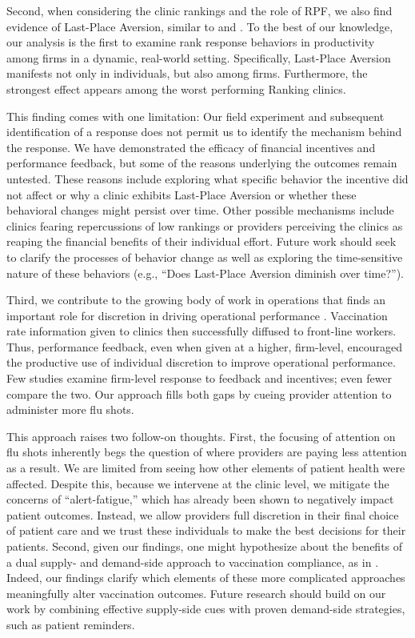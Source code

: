 \begin{onehalfspace}
 Second, when considering the clinic rankings and the role of RPF, we also find evidence of Last-Place Aversion, similar to \cite{Kuziemko2014,Gill2019} and \cite{Buell2021}. To the best of our knowledge, our analysis is the first to examine rank response behaviors in productivity among firms in a dynamic, real-world setting. Specifically, Last-Place Aversion manifests not only in individuals, but also among firms. Furthermore, the strongest effect appears among the worst performing Ranking clinics. 

 This finding comes with one limitation: Our field experiment and subsequent identification of a response does not permit us to identify the mechanism behind the response. We have demonstrated the efficacy of financial incentives and performance feedback, but some of the reasons underlying the outcomes remain untested. These reasons include exploring what specific behavior the incentive did not affect or why a clinic exhibits Last-Place Aversion or whether these behavioral changes might persist over time. Other possible mechanisms include clinics fearing repercussions of low rankings or providers perceiving the clinics as reaping the financial benefits of their individual effort. Future work should seek to clarify the processes of behavior change as well as exploring the time-sensitive nature of these behaviors (e.g., “Does Last-Place Aversion diminish over time?”). 

 Third, we contribute to the growing body of work in operations that finds an important role for discretion in driving operational performance \citep[e.g.,][]{VanDonselaar2010,Campbell2011,Kim2015,Phillips2015,Ibanez2017,Song2018a}. Vaccination rate information given to clinics then successfully diffused to front-line workers. Thus, performance feedback, even when given at a higher, firm-level, encouraged the productive use of individual discretion to improve operational performance. Few studies examine firm-level response to feedback and incentives; even fewer compare the two. Our approach fills both gaps by cueing provider attention to administer more flu shots.

 This approach raises two follow-on thoughts. First, the focusing of attention on flu shots inherently begs the question of where providers are paying less attention as a result. We are limited from seeing how other elements of patient health were affected. Despite this, because we intervene at the clinic level, we mitigate the concerns of “alert-fatigue,” which has already been shown to negatively impact patient outcomes. Instead, we allow providers full discretion in their final choice of patient care and we trust these individuals to make the best decisions for their patients. Second, given our findings, one might hypothesize about the benefits of a dual supply- and demand-side approach to vaccination compliance, as in \cite{Zimmerman2014}. Indeed, our findings clarify which elements of these more complicated approaches meaningfully alter vaccination outcomes. Future research should build on our work by combining effective supply-side cues with proven demand-side strategies, such as patient reminders.


\end{onehalfspace}
